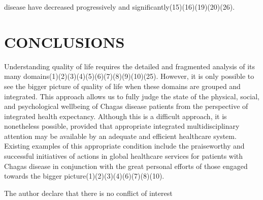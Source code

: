  disease have decreased progressively and significantly(15)(16)(19)(20)(26). \section*{CONCLUSIONS}\par Understanding quality of life requires the detailed and fragmented analysis of its many
 domains(1)(2)(3)(4)(5)(6)(7)(8)(9)(10)(25). However, it is only possible to see the
 bigger picture of quality of life when these domains are grouped and integrated. This
 approach allows us to fully judge the state of the physical, social, and psychological
 wellbeing of Chagas disease patients from the perspective of integrated health
 expectancy. Although this is a difficult approach, it is nonetheless possible, provided
 that appropriate integrated multidisciplinary attention may be available by an adequate
 and efficient healthcare system. Existing examples of this appropriate condition include
 the praiseworthy and successful initiatives of actions in global healthcare services for
 patients with Chagas disease in conjunction with the great personal efforts of those
 engaged towards the bigger picture(1)(2)(3)(4)(6)(7)(8)(10).
\medskip\par\noindent
 The author declare that there is no conflict of interest
 \balance
\pagebreak\onecolumn
